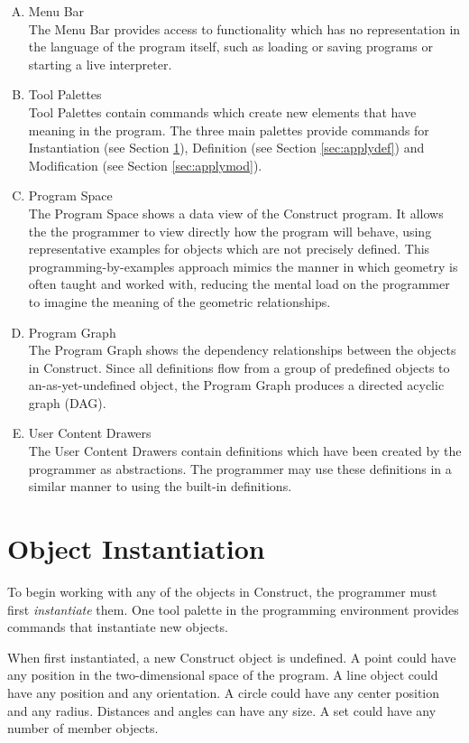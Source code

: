 \documentclass[twoside,openright,11pt]{report}
\begin{document}
\begin{enumerate}[(A)]
  \item Menu Bar \\
    The Menu Bar provides access to functionality which has no representation in the language of the program itself, such as loading or saving programs or starting a live interpreter.
  \item Tool Palettes \\
    Tool Palettes contain commands which create new elements that have meaning in the program. 
    The three main palettes provide commands for Instantiation (see Section \ref{sec:inst}), Definition (see Section \ref{sec:applydef}) and Modification (see Section \ref{sec:applymod}).
  \item Program Space \\
    The Program Space shows a data view of the Construct program. 
    It allows the the programmer to view directly how the program will behave, using representative examples for objects which are not precisely defined. 
    This programming-by-examples approach mimics the manner in which geometry is often taught and worked with, reducing the mental load on the programmer to imagine the meaning of the geometric relationships.
  \item Program Graph \\
    The Program Graph shows the dependency relationships between the objects in Construct. 
    Since all definitions flow from a group of predefined objects to an-as-yet-undefined object, the Program Graph produces a directed acyclic graph (DAG).
  \item User Content Drawers \\
    The User Content Drawers contain definitions which have been created by the programmer as abstractions.
    The programmer may use these definitions in a similar manner to using the built-in definitions.
\end{enumerate}

\section{Object Instantiation}
\label{sec:inst}

To begin working with any of the objects in Construct, the programmer must first {\it instantiate} them. 
One tool palette in the programming environment provides commands that instantiate new objects. 

When first instantiated, a new Construct object is undefined.
A point could have any position in the two-dimensional space of the program. 
A line object could have any position and any orientation.
A circle could have any center position and any radius. 
Distances and angles can have any size.
A set could have any number of member objects.
\end{document}
